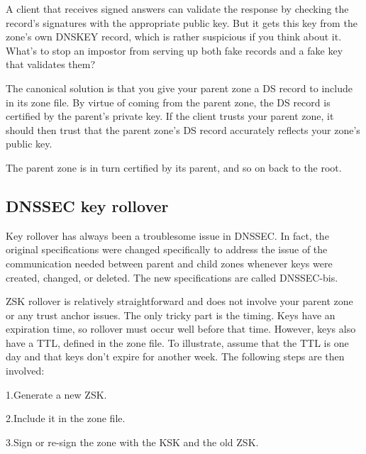 A client that receives signed answers can validate the response by
checking the record's signatures with the appropriate public key. But it
gets this key from the zone's own DNSKEY record, which is rather
suspicious if you think about it. What's to stop an impostor from
serving up both fake records and a fake key that validates them?

The canonical solution is that you give your parent zone a DS record to
include in its zone file. By virtue of coming from the parent zone, the
DS record is certified by the parent's private key. If the client trusts
your parent zone, it should then trust that the parent zone's DS record
accurately reflects your zone's public key.

The parent zone is in turn certified by its parent, and so on back to
the root.

\protect\hypertarget{part0024_split_066.html}{}{}

\hypertarget{part0024_split_066.htmlux5cux23_idContainer1069}{}
\hypertarget{part0024_split_066.htmlux5cux23calibre_pb_65}{%
\subsection[DNSSEC key
rollover]{\texorpdfstring{\protect\hypertarget{part0024_split_066.htmlux5cux23_idTextAnchor946}{}{}DNSSEC
key
rollover}{DNSSEC key rollover}}\label{part0024_split_066.htmlux5cux23calibre_pb_65}}

\protect\hypertarget{part0024_split_066.htmlux5cux23_idIndexMarker2270}{}{}\protect\hypertarget{part0024_split_066.htmlux5cux23_idTextAnchor947}{}{}Key
rollover has always been a troublesome issue in DNSSEC. In fact, the
original specifications were changed specifically to address the issue
of the communication needed between parent and child zones whenever keys
were created, changed, or deleted. The new specifications are called
DNSSEC-bis.

ZSK rollover is relatively straightforward and does not involve your
parent zone or any trust anchor issues. The only tricky part is the
timing. Keys have an expiration time, so rollover must occur well before
that time. However, keys also have a TTL, defined in the zone file. To
illustrate, assume that the TTL is one day and that keys don't expire
for another week. The following steps are then involved:

{1.}Generate a new ZSK.

{2.}Include it in the zone file.

{3.}Sign or re-sign the zone with the KSK and the {old} ZSK.

